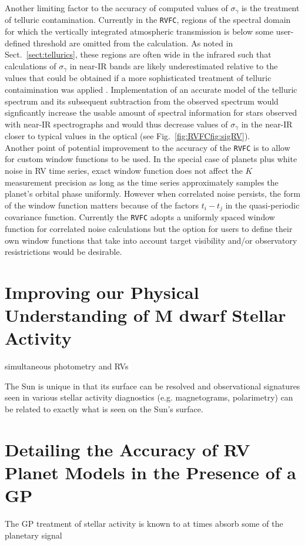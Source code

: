 Another limiting factor to the accuracy of computed values of $\sigma_{\gamma}$
is the treatment of telluric contamination. Currently in the \texttt{RVFC},
regions of the spectral domain for which the vertically integrated atmospheric
transmission is below some user-defined threshold are omitted from the
calculation. As noted in Sect.~\ref{sect:tellurics}, these regions are often
wide in the infrared such that calculations of $\sigma_{\gamma}$ in near-IR
bands are likely underestimated relative to the values that could be obtained
if a more sophisticated treatment of telluric contaimination was applied
\citep[e.g.][]{artigau14,bedell19}. Implementation of an accurate model of the
telluric spectrum and its subsequent subtraction from the observed spectrum
would signficantly increase the usable amount of spectral information for stars
observed with near-IR spectrographs and would thus decrease values of
$\sigma_{\gamma}$ in the near-IR closer to typical values in the optical (see
Fig.~\ref{fig:RVFCfig:sigRV}). \\

Another point of potential improvement to the accuracy of the \texttt{RVFC} is
to allow for custom window functions to be used. In the special case of planets
plus white noise in RV time series, exact window function does not affect the
$K$ measurement precision \sigK{} as long as the time series approximately
samples the planet's orbital phase uniformly. However when correlated noise
persists, the form of the window function matters because of the factors
$t_i-t_j$ in the quasi-periodic covariance function. Currently the \texttt{RVFC}
adopts a uniformly spaced window function for correlated noise calculations but
the option for users to define their own window functions that take into account
target visibility and/or observatory resistrictions would be desirable.


\section{Improving our Physical Understanding of M dwarf Stellar Activity}

simultaneous photometry and RVs

The Sun is unique in that its surface can be resolved and observational
signatures seen in various stellar activity diagnostics (e.g. magnetograms,
polarimetry) can be related to exactly what is seen on the Sun's surface.  


\section{Detailing the Accuracy of RV Planet Models in the Presence of a GP}
The GP treatment of stellar activity is known to at times absorb some of
the planetary signal \citep[e.g.][]{ribas18}


